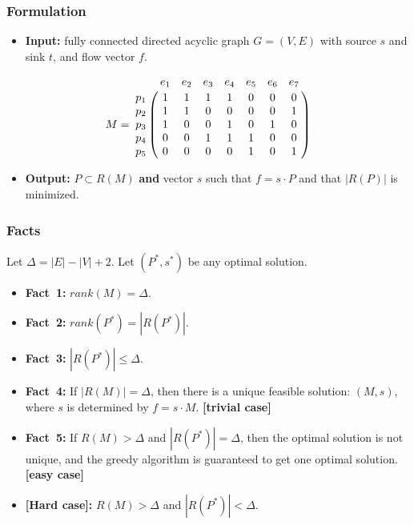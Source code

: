 \frame
{
	\frametitle{Formulation}

	\begin{itemize}
	\item<1-> {\bf Input:} fully connected directed acyclic graph $G=(V,E)$ with source $s$ and sink $t$,
		and flow vector $f$.
	\end{itemize}

	\vspace{0.8cm}
	
	\vspace{-0.1cm}

	\begin{displaymath}
	M = \bordermatrix{
		~   & e_1 & e_2 & e_3 & e_4 & e_5 & e_6 & e_7 \cr
		p_1 & 1 & 1 & 1 & 1 & 0 & 0 & 0 \cr
		p_2 & 1 & 1 & 0 & 0 & 0 & 0 & 1 \cr
		p_3 & 1 & 0 & 0 & 1 & 0 & 1 & 0 \cr
		p_4 & 0 & 0 & 1 & 1 & 1 & 0 & 0 \cr
		p_5 & 0 & 0 & 0 & 0 & 1 & 0 & 1 \cr
	}
	\end{displaymath}

	\vspace{0.1cm}

	\begin{itemize}
	\item<1-> {\bf Output:} $P\subset R(M)$ {\bf and} vector $s$
		such that $f = s\cdot P$ and that $|R(P)|$ is minimized.
	\end{itemize}
}

\frame
{
	\frametitle{Facts}
	Let $\Delta = |E| - |V| + 2$. Let $(P^*, s^*)$ be any optimal solution.
	\vspace{0.3cm}
	\begin{itemize}
	\item<1-> {\bf Fact~1:} $rank(M) = \Delta$.
	\vspace{0.3cm}
	\item<1-> {\bf Fact~2:} $rank(P^*) = |R(P^*)|$.
	\vspace{0.3cm}
	\item<1-> {\bf Fact~3:} $|R(P^*)| \le \Delta$.
	\vspace{0.3cm}
	\item<1-> {\bf Fact~4:} If $|R(M)| = \Delta$, then there is a unique feasible solution: $(M, s)$, where
		$s$ is determined by $f = s\cdot M$. {\bf [trivial case]}
	\vspace{0.3cm}
	\item<1-> {\bf Fact~5:} If $R(M) > \Delta$ and $|R(P^*)| = \Delta$, then the optimal solution is not unique,
		and the greedy algorithm is guaranteed to get one optimal solution. {\bf [easy case]}
	\vspace{0.3cm}
	\item<1-> {\bf [Hard case]:} $R(M) > \Delta$ and $|R(P^*)| < \Delta$.
	\end{itemize}
}

